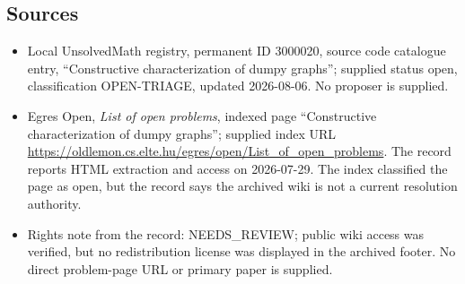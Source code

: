 \documentclass[11pt]{article}
\begin{document}
\subsection{Sources}
\begin{itemize}
\item Local UnsolvedMath registry, permanent ID 3000020, source code catalogue entry, ``Constructive characterization of dumpy graphs''; supplied status open, classification OPEN-TRIAGE, updated 2026-08-06. No proposer is supplied.
\item Egres Open, \emph{List of open problems}, indexed page ``Constructive characterization of dumpy graphs''; supplied index URL \url{https://oldlemon.cs.elte.hu/egres/open/List_of_open_problems}. The record reports HTML extraction and access on 2026-07-29. The index classified the page as open, but the record says the archived wiki is not a current resolution authority.
\item Rights note from the record: NEEDS\_REVIEW; public wiki access was verified, but no redistribution license was displayed in the archived footer. No direct problem-page URL or primary paper is supplied.
\end{itemize}
\end{document}
